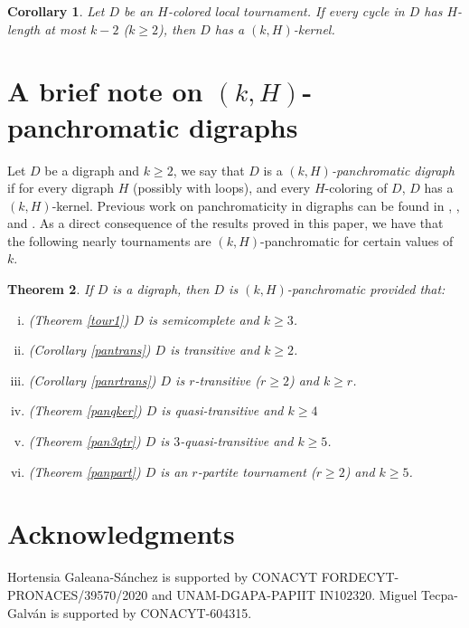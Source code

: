 \documentclass[10pt,a4paper]{article}
\newtheorem{theorem}{Theorem}[section]
\newtheorem{cor}[theorem]{Corollary}
\begin{document}
\begin{cor}
Let $D$ be an $H$-colored local tournament. If every cycle in $D$ has $H$-length at most $k-2$ ($k \geq 2$), then $D$ has a $(k,H)$-kernel. 
\end{cor}

\section{A brief note on $(k, H)$-panchromatic digraphs}

Let $D$ be a digraph and $k \geq 2$, we say that $D$ is a \emph{$(k,H)$-panchromatic digraph} if for every digraph $H$ (possibly with loops), and every $H$-coloring of $D$, $D$ has a $(k,H)$-kernel. Previous work on panchromaticity in digraphs can be found in \cite{pan2}, \cite{pan1}, \cite{pan4} and \cite{pan3}. As a direct consequence of the results proved in this paper, we have that the following nearly tournaments are $(k,H)$-panchromatic for certain values of $k$. 

\begin{theorem}
If $D$ is a digraph, then $D$ is $(k, H)$-panchromatic provided that:
\begin{enumerate}[(i)]
\item (Theorem \ref{tour1}) $D$ is semicomplete and $k \geq 3$.

\item (Corollary \ref{pantrans})  $D$ is transitive and $k \geq 2$.

\item (Corollary \ref{panrtrans})  $D$ is $r$-transitive ($r \geq 2$) and $k \geq r$.

\item (Theorem \ref{panqker}) $D$ is quasi-transitive and $k \geq 4$

\item (Theorem \ref{pan3qtr}) $D$ is $3$-quasi-transitive and $k \geq 5$.

\item (Theorem \ref{panpart}) $D$ is an $r$-partite tournament ($r \geq 2$) and $k \geq 5$.
\end{enumerate}
\end{theorem}

\section*{Acknowledgments}
Hortensia Galeana-Sánchez is supported by CONACYT FORDECYT-PRONACES/39570/2020 and UNAM-DGAPA-PAPIIT IN102320. 
Miguel Tecpa-Galván is supported by CONACYT-604315.
\end{document}
